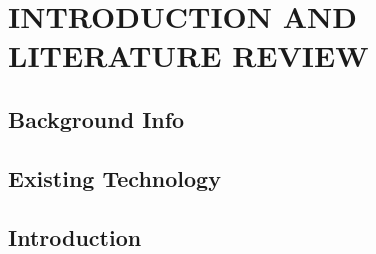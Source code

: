 %
%
%
%


\pagestyle{plain} %

\chapter{INTRODUCTION AND LITERATURE REVIEW}

\section{Background Info}
\section{Existing Technology}
\section{Introduction}




